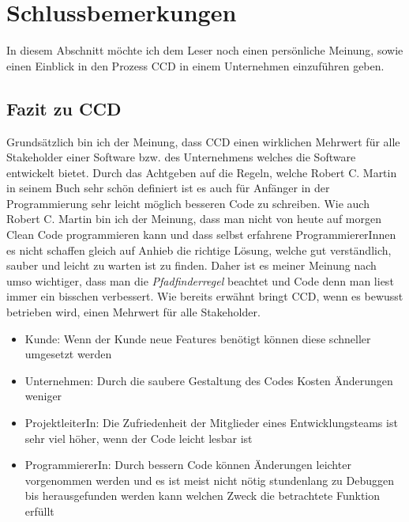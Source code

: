 \chapter{Schlussbemerkungen}
\label{cha:Schluss}
In diesem Abschnitt möchte ich dem Leser noch einen persönliche Meinung, sowie einen Einblick in den Prozess CCD in einem Unternehmen einzuführen geben.
\section{Fazit zu CCD}
 Grundsätzlich bin ich der Meinung, dass CCD einen wirklichen Mehrwert für alle Stakeholder einer Software bzw. des Unternehmens welches die Software entwickelt bietet. Durch das Achtgeben auf die Regeln, welche Robert C. Martin in seinem Buch sehr schön definiert ist es auch für Anfänger in der Programmierung sehr leicht möglich besseren Code zu schreiben. Wie auch Robert C. Martin bin ich der Meinung, dass man nicht von heute auf morgen Clean Code programmieren kann und dass selbst erfahrene ProgrammiererInnen es nicht schaffen gleich auf Anhieb die richtige Lösung, welche gut verständlich, sauber und leicht zu warten ist zu finden. Daher ist es meiner Meinung nach umso wichtiger, dass man die \textit{Pfadfinderregel} beachtet und Code denn man liest immer ein bisschen verbessert. Wie bereits erwähnt bringt CCD, wenn es bewusst betrieben wird, einen Mehrwert für alle Stakeholder. 
\begin{itemize}
	\item Kunde: Wenn der Kunde neue Features benötigt können diese schneller umgesetzt werden
	\item Unternehmen: Durch die saubere Gestaltung des Codes Kosten Änderungen weniger
	\item ProjektleiterIn: Die Zufriedenheit der Mitglieder eines Entwicklungsteams ist sehr viel höher, wenn der Code leicht lesbar ist
	\item ProgrammiererIn: Durch bessern Code können Änderungen leichter vorgenommen werden und es ist meist nicht nötig stundenlang zu Debuggen bis herausgefunden werden kann welchen Zweck die betrachtete Funktion erfüllt
\end{itemize}


